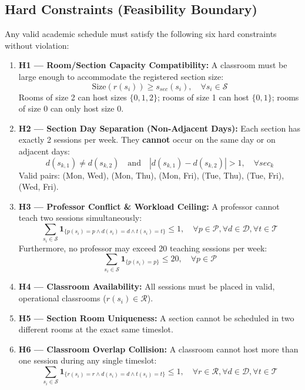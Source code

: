 \subsection{Hard Constraints (Feasibility Boundary)}
Any valid academic schedule must satisfy the following six hard constraints without violation:
\begin{enumerate}[leftmargin=2.0em]
  \item \textbf{H1 --- Room/Section Capacity Compatibility:}
  A classroom must be large enough to accommodate the registered section size:
  \begin{equation}
    \text{Size}(r(s_i)) \ge s_{sec}(s_i), \quad \forall s_i \in \mathcal{S}
  \end{equation}
  Rooms of size 2 can host sizes $\{0, 1, 2\}$; rooms of size 1 can host $\{0, 1\}$; rooms of size 0 can only host size $0$.

  \item \textbf{H2 --- Section Day Separation (Non-Adjacent Days):}
  Each section has exactly 2 sessions per week. They \textbf{cannot} occur on the same day or on adjacent days:
  \begin{equation}
    d(s_{k, 1}) \ne d(s_{k, 2}) \quad \text{and} \quad |d(s_{k, 1}) - d(s_{k, 2})| > 1, \quad \forall sec_k
  \end{equation}
  Valid pairs: (Mon, Wed), (Mon, Thu), (Mon, Fri), (Tue, Thu), (Tue, Fri), (Wed, Fri).

  \item \textbf{H3 --- Professor Conflict \& Workload Ceiling:}
  A professor cannot teach two sessions simultaneously:
  \begin{equation}
    \sum_{s_i \in \mathcal{S}} \mathbf{1}_{\{p(s_i) = p \land d(s_i) = d \land t(s_i) = t\}} \le 1, \quad \forall p \in \mathcal{P}, \forall d \in \mathcal{D}, \forall t \in \mathcal{T}
  \end{equation}
  Furthermore, no professor may exceed 20 teaching sessions per week:
  \begin{equation}
    \sum_{s_i \in \mathcal{S}} \mathbf{1}_{\{p(s_i) = p\}} \le 20, \quad \forall p \in \mathcal{P}
  \end{equation}

  \item \textbf{H4 --- Classroom Availability:}
  All sessions must be placed in valid, operational classrooms ($r(s_i) \in \mathcal{R}$).

  \item \textbf{H5 --- Section Room Uniqueness:}
  A section cannot be scheduled in two different rooms at the exact same timeslot.

  \item \textbf{H6 --- Classroom Overlap Collision:}
  A classroom cannot host more than one session during any single timeslot:
  \begin{equation}
    \sum_{s_i \in \mathcal{S}} \mathbf{1}_{\{r(s_i) = r \land d(s_i) = d \land t(s_i) = t\}} \le 1, \quad \forall r \in \mathcal{R}, \forall d \in \mathcal{D}, \forall t \in \mathcal{T}
  \end{equation}
\end{enumerate}


